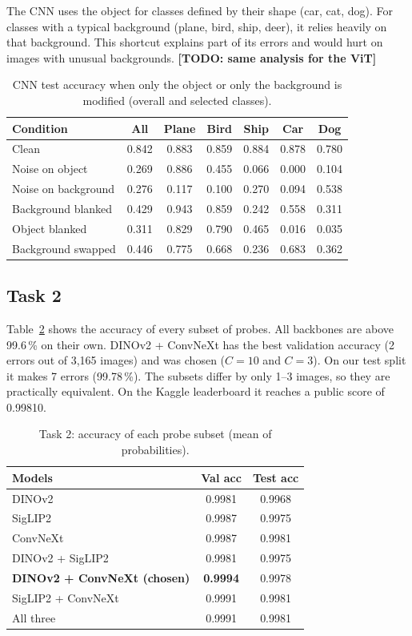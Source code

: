 \documentclass[conference]{IEEEtran}
\newcommand{\todo}[1]{\textbf{[TODO: #1]}}
\begin{document}
The CNN uses the object for classes defined by their shape (car, cat, dog). For classes with a typical background (plane, bird, ship, deer), it relies heavily on that background. This shortcut explains part of its errors and would hurt on images with unusual backgrounds. \todo{same analysis for the ViT}

\begin{table}[t]
\centering
\caption{CNN test accuracy when only the object or only the background is modified (overall and selected classes).}
\label{tab:masks}
\begin{tabular}{lcccccc}
\toprule
Condition & All & Plane & Bird & Ship & Car & Dog \\
\midrule
Clean & 0.842 & 0.883 & 0.859 & 0.884 & 0.878 & 0.780 \\
Noise on object & 0.269 & 0.886 & 0.455 & 0.066 & 0.000 & 0.104 \\
Noise on background & 0.276 & 0.117 & 0.100 & 0.270 & 0.094 & 0.538 \\
Background blanked & 0.429 & 0.943 & 0.859 & 0.242 & 0.558 & 0.311 \\
Object blanked & 0.311 & 0.829 & 0.790 & 0.465 & 0.016 & 0.035 \\
Background swapped & 0.446 & 0.775 & 0.668 & 0.236 & 0.683 & 0.362 \\
\bottomrule
\end{tabular}
\end{table}

\subsection{Task 2}
Table~\ref{tab:task2} shows the accuracy of every subset of probes. All backbones are above 99.6\,\% on their own. DINOv2 + ConvNeXt has the best validation accuracy (2 errors out of 3{,}165 images) and was chosen ($C=10$ and $C=3$). On our test split it makes 7 errors (99.78\,\%). The subsets differ by only 1--3 images, so they are practically equivalent. On the Kaggle leaderboard it reaches a public score of 0.99810.

\begin{table}[t]
\centering
\caption{Task 2: accuracy of each probe subset (mean of probabilities).}
\label{tab:task2}
\begin{tabular}{lcc}
\toprule
Models & Val acc & Test acc \\
\midrule
DINOv2 & 0.9981 & 0.9968 \\
SigLIP2 & 0.9987 & 0.9975 \\
ConvNeXt & 0.9987 & 0.9981 \\
DINOv2 + SigLIP2 & 0.9981 & 0.9975 \\
\textbf{DINOv2 + ConvNeXt (chosen)} & \textbf{0.9994} & 0.9978 \\
SigLIP2 + ConvNeXt & 0.9991 & 0.9981 \\
All three & 0.9991 & 0.9981 \\
\bottomrule
\end{tabular}
\end{table}
\end{document}
